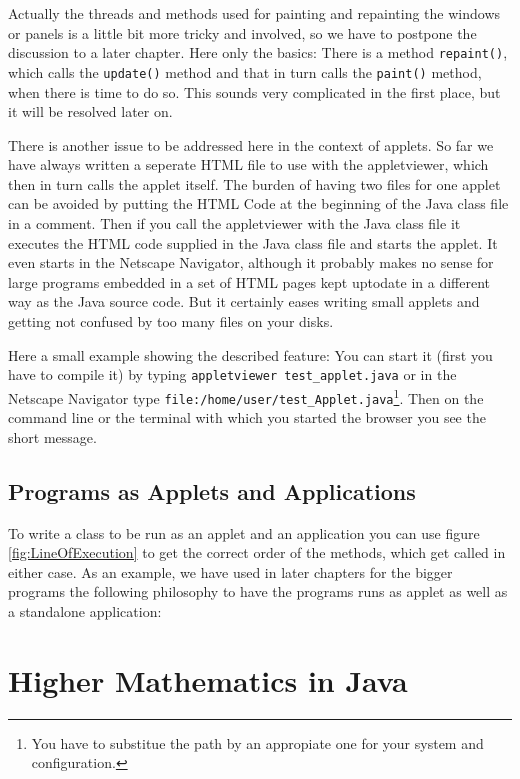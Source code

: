 Actually the threads and methods used for painting and repainting
the windows or panels is a little bit more tricky and involved, so we
have to postpone the discussion to a later chapter. Here only the basics:
There is a method \verb|repaint()|, which calls the \verb|update()|
method and that in turn calls the \verb|paint()| method, when there is time
to do so. This sounds very complicated in the first place, but 
it will be resolved later on.

There is another issue to be addressed here in the context of applets.
So far we have always written a seperate HTML file to use with the
appletviewer, which then in turn calls the applet itself. The burden
of having two files for one applet can be avoided by putting the
HTML Code at the beginning of the Java class file in a comment. Then
if you call the appletviewer with the Java class file 
it executes the HTML code supplied
in the Java class file and starts the applet. It even starts in
the Netscape Navigator, although it probably makes no sense for
large programs embedded in a set of HTML pages kept uptodate in a
different way as the Java source code. But it certainly eases
writing small applets and getting not confused by too many files on
your disks. 

Here a small example showing the described feature:
You can start it (first you have to compile it) 
by typing \verb|appletviewer test_applet.java| or 
in the Netscape Navigator type 
\verb|file:/home/user/test_Applet.java|\footnote{You have to substitue the path 
  by an appropiate one for your system and configuration.}.
Then on the command line or the terminal with which you started the browser  
you see the short message.


\subsection{Programs as Applets and Applications}
To write a class to be run as an applet and an application
you can use figure \ref{fig:LineOfExecution} to get the correct order
of the methods, which get called in either case. As an example, we have used
in later chapters for the bigger programs the following philosophy
to have the programs runs as applet as well as a standalone application:


\section{Higher Mathematics in Java}

